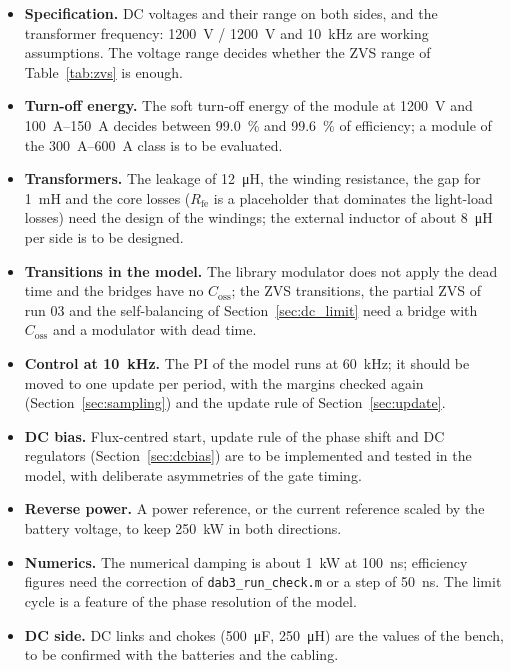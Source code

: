 \documentclass[12pt,a4paper]{scrartcl}
\newcommand{\ped}[1]{_{\mathrm{#1}}}
\newcommand{\code}[1]{\texttt{#1}}
\begin{document}
\begin{onehalfspace}
\begin{itemize}[nosep]
	\item \textbf{Specification.} DC voltages and their range on both sides, and the transformer frequency: \SI{1200}{\volt} / \SI{1200}{\volt} and \SI{10}{\kilo\hertz} are working assumptions. The voltage range decides whether the ZVS range of Table~\ref{tab:zvs} is enough.
	\item \textbf{Turn-off energy.} The soft turn-off energy of the module at \SI{1200}{\volt} and \SIrange{100}{150}{\ampere} decides between \SI{99.0}{\percent} and \SI{99.6}{\percent} of efficiency; a module of the \SIrange{300}{600}{\ampere} class is to be evaluated.
	\item \textbf{Transformers.} The leakage of \SI{12}{\micro\henry}, the winding resistance, the gap for \SI{1}{\milli\henry} and the core losses ($R\ped{fe}$ is a placeholder that dominates the light-load losses) need the design of the windings; the external inductor of about \SI{8}{\micro\henry} per side is to be designed.
	\item \textbf{Transitions in the model.} The library modulator does not apply the dead time and the bridges have no $C\ped{oss}$; the ZVS transitions, the partial ZVS of run 03 and the self-balancing of Section~\ref{sec:dc_limit} need a bridge with $C\ped{oss}$ and a modulator with dead time.
	\item \textbf{Control at \SI{10}{\kilo\hertz}.} The PI of the model runs at \SI{60}{\kilo\hertz}; it should be moved to one update per period, with the margins checked again (Section~\ref{sec:sampling}) and the update rule of Section~\ref{sec:update}.
	\item \textbf{DC bias.} Flux-centred start, update rule of the phase shift and DC regulators (Section~\ref{sec:dcbias}) are to be implemented and tested in the model, with deliberate asymmetries of the gate timing.
	\item \textbf{Reverse power.} A power reference, or the current reference scaled by the battery voltage, to keep \SI{250}{\kilo\watt} in both directions.
	\item \textbf{Numerics.} The numerical damping is about \SI{1}{\kilo\watt} at \SI{100}{\nano\second}; efficiency figures need the correction of \code{dab3\_run\_check.m} or a step of \SI{50}{\nano\second}. The limit cycle is a feature of the phase resolution of the model.
	\item \textbf{DC side.} DC links and chokes (\SI{500}{\micro\farad}, \SI{250}{\micro\henry}) are the values of the bench, to be confirmed with the batteries and the cabling.
\end{itemize}


\end{onehalfspace}
\end{document}
